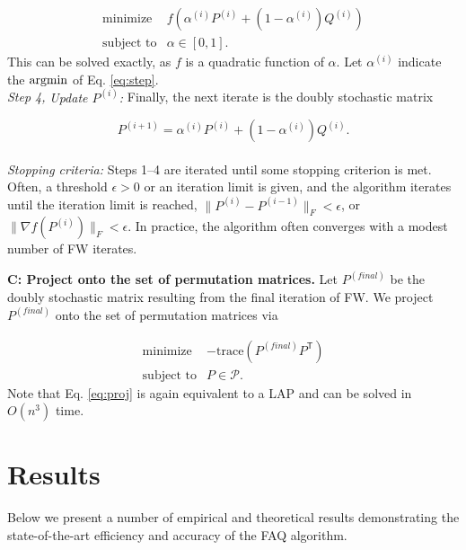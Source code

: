 \documentclass[10pt]{article}
\providecommand{\mc}[1]{\mathcal{#1}}
\newcommand{\PmcP}{P \in \mc{P}}
\providecommand{\mc}[1]{\mathcal{#1}}
\newcommand{\T}{^{\ensuremath{\mathsf{T}}}}
\newcommand{\argmin}{\operatornamewithlimits{argmin}}
\begin{document}
\begin{equation}
\begin{array}{cl}
			\text{minimize}   & f(\alpha^{(i)} P^{(i)} + (1-\alpha^{(i)}) Q^{(i)}) \\
			\text{subject to}  & \alpha \in [0,1].   
\end{array} \label{eq:step}
\end{equation}
This can be solved exactly, as $f$ is a quadratic function of $\alpha$.  Let $\alpha^{(i)}$ indicate the $\argmin$ of Eq. \eqref{eq:step}.
\\
{\it Step 4,} {\it Update $P^{(i)}$:} Finally, the next iterate is the doubly stochastic matrix 

\begin{equation} \label{eq:update}
	P^{(i+1)} = \alpha^{(i)} P^{(i)} + (1-\alpha^{(i)}) Q^{(i)}.
\end{equation}
\\
{\it Stopping criteria:} Steps 1--4 are iterated until some stopping criterion is met.  Often, a threshold $\epsilon>0$ or an iteration limit is given, and the algorithm iterates until the iteration limit is reached, $\|P^{(i)}-P^{(i-1)}\|_F<\epsilon$, or $\|\nabla f(P^{(i)})\|_F<\epsilon$.  In practice, the algorithm often converges with a modest number of FW iterates.

\noindent\textbf{C: Project onto the set of permutation matrices.}   Let $P^{(final)}$ be the doubly stochastic matrix resulting from the final iteration of FW.  We project $P^{(final)}$ onto the set of permutation matrices via

\begin{equation}
\begin{array}{cl}
			\text{minimize}   & -\text{trace}( P^{(final)} P\T) \\
			\text{subject to}  & \PmcP.   
\end{array} \label{eq:proj}
\end{equation}
  Note that Eq. \eqref{eq:proj} is again equivalent to a LAP and can be solved in $O(n^3)$ time.



\section{Results} 
\label{sec:results}

Below we present a number of empirical and theoretical results demonstrating the state-of-the-art efficiency and accuracy of the FAQ algorithm.
\end{document}
